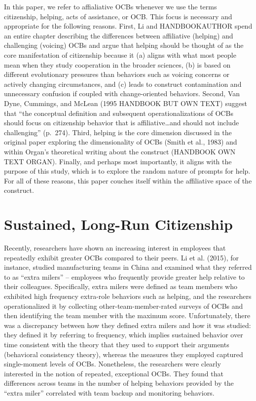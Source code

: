 \documentclass[english,,man]{apa6}
\theoremstyle{definition}
\theoremstyle{definition}
\theoremstyle{definition}
\theoremstyle{remark}
\begin{document}
In this paper, we refer to affialiative OCBs whenever we use the terms
citizenship, helping, acts of assistance, or OCB. This focus is
necessary and appropriate for the following reasons. First, Li and
HANDBOOKAUTHOR spend an entire chapter describing the differences
between affiliative (helping) and challenging (voicing) OCBs and argue
that helping should be thought of as the core manifestation of
citizenship because it (a) aligns with what most people mean when they
study cooperation in the broader sciences, (b) is based on different
evolutionary pressures than behaviors such as voicing concerns or
actively changing circumstances, and (c) leads to construct
contamination and unnecessary confusion if coupled with change-oriented
behaviors. Second, Van Dyne, Cummings, and McLean (1995 HANDBOOK BUT OWN
TEXT) suggest that \enquote{the conceptual definition and subsequent
operationalizations of OCBs should focus on citizenship behavior that is
affiliative\ldots{}and should not include challenging} (p.~274). Third,
helping is the core dimension discussed in the original paper exploring
the dimensionality of OCBs (Smith et al., 1983) and within Organ's
theoretical writing about the construct (HANDBOOK OWN TEXT ORGAN).
Finally, and perhaps most importantly, it aligns with the purpose of
this study, which is to explore the random nature of prompts for help.
For all of these reasons, this paper couches itself within the
affiliative space of the construct.

\hypertarget{sustained-long-run-citizenship}{%
\section{Sustained, Long-Run
Citizenship}\label{sustained-long-run-citizenship}}

Recently, researchers have shown an increasing interest in employees
that repeatedly exhibit greater OCBs compared to their peers. Li et al.
(2015), for instance, studied manufacturing teams in China and examined
what they referred to as \enquote{extra milers} -- employees who
frequently provide greater help relative to their colleagues.
Specifically, extra milers were defined as team members who exhibited
high frequency extra-role behaviors such as helping, and the researchers
operationalized it by collecting other-team-member-rated surveys of OCBs
and then identifying the team member with the maximum score.
Unfortunately, there was a discrepancy between how they defined extra
milers and how it was studied: they defined it by referring to
frequency, which implies sustained behavior over time consistent with
the theory that they used to support their arguments (behavioral
consistency theory), whereas the measures they employed captured
single-moment levels of OCBs. Nonetheless, the researchers were clearly
interested in the notion of repeated, exceptional OCBs. They found that
differences across teams in the number of helping behaviors provided by
the \enquote{extra miler} correlated with team backup and monitoring
behaviors.
\end{document}
